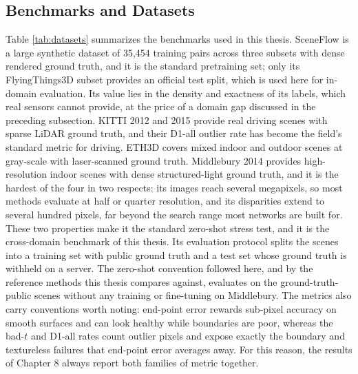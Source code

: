 \subsection{Benchmarks and Datasets}
Table \ref{tab:datasets} summarizes the benchmarks used in this thesis.
SceneFlow is a large synthetic dataset of 35,454 training pairs across
three subsets with dense rendered ground truth, and it is the standard
pretraining set; only its FlyingThings3D subset provides an official
test split, which is used here for in-domain evaluation. Its value lies
in the density and exactness of its labels, which real sensors cannot
provide, at the price of a domain gap discussed in the preceding
subsection. KITTI 2012 and 2015 provide real driving scenes with sparse
LiDAR ground truth, and their D1-all outlier rate has become the
field's standard metric for driving. ETH3D covers mixed indoor and
outdoor scenes at gray-scale with laser-scanned ground truth. Middlebury
2014 provides high-resolution indoor scenes with dense structured-light
ground truth, and it is the hardest of the four in two respects: its
images reach several megapixels, so most methods evaluate at half or
quarter resolution, and its disparities extend to several hundred pixels,
far beyond the search range most networks are built for. These two
properties make it the standard zero-shot stress test, and it is the
cross-domain benchmark of this thesis. Its evaluation protocol splits the
scenes into a training set with public ground truth and a test set whose
ground truth is withheld on a server. The zero-shot convention followed
here, and by the reference methods this thesis compares against,
evaluates on the ground-truth-public scenes without any training or
fine-tuning on Middlebury. The metrics also carry conventions worth
noting: end-point error rewards sub-pixel accuracy on smooth surfaces and
can look healthy while boundaries are poor, whereas the bad-$t$ and
D1-all rates count outlier pixels and expose exactly the boundary and
textureless failures that end-point error averages away. For this
reason, the results of Chapter 8 always report both families of metric
together.

